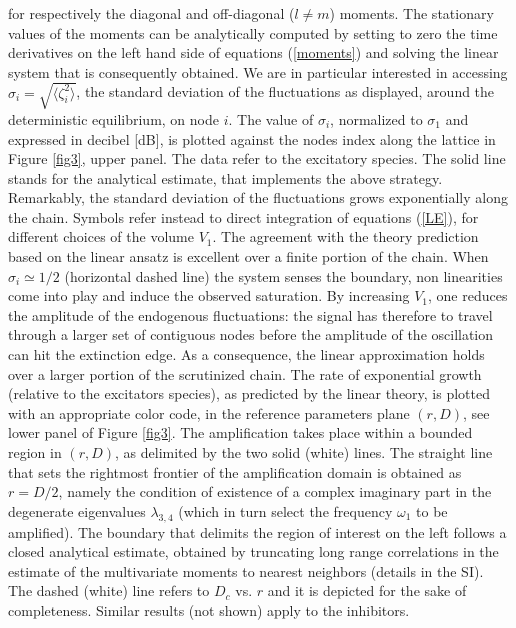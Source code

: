 \documentclass[showpacs,prl,superscriptaddress,nofootinbib, twocolumn]{revtex4}
\begin{document}
for respectively the diagonal and off-diagonal ($l \ne m$) moments. The stationary values of the moments can be analytically computed by setting to zero the time derivatives on the left hand side of equations (\ref{moments}) and solving the linear system that is consequently obtained. We are in particular interested in accessing $\sigma_i=\sqrt{\langle \zeta_i^2 \rangle}$, the standard deviation of the fluctuations as displayed, around the deterministic equilibrium, on node $i$. The value of  $\sigma_i$, normalized to $\sigma_1$ and expressed in decibel [dB], is plotted against the nodes index along the lattice in Figure  \ref{fig3}, upper panel. The data refer to the excitatory species. The solid line stands for the analytical estimate, that implements the above strategy. Remarkably, the standard deviation of the fluctuations grows exponentially along the chain. Symbols refer instead to direct integration of equations (\ref{LE}), for different choices of the volume $V_1$. The agreement with the theory prediction based on the linear ansatz is excellent over a finite portion of the chain. When $\sigma_i \simeq 1/2$ (horizontal dashed line) the system senses the boundary, non linearities come into play and induce the observed saturation. By increasing $V_1$, one reduces the amplitude of the endogenous fluctuations: the signal has therefore to travel through a larger set of contiguous nodes before the amplitude of the oscillation  can hit the extinction edge. As a consequence, the linear approximation holds over a larger portion of the scrutinized chain.
The rate of exponential growth (relative to the excitators species), as predicted by the linear theory, is plotted with an appropriate color code, in the reference parameters plane $(r,D)$, see lower panel of Figure \ref{fig3}. The amplification takes place within a bounded region in $(r,D)$, as delimited by the two solid (white) lines. The straight line that sets the rightmost frontier of the amplification domain is  obtained as $r=D/2$, namely the condition of existence of a complex imaginary part in the degenerate eigenvalues $\lambda_{3,4}$ (which in turn select the frequency $\omega_1$ to be amplified). The boundary that delimits the region of interest on the left follows a closed analytical estimate, obtained by truncating long range correlations in the estimate of the multivariate moments to nearest neighbors (details in the SI). The dashed (white) line refers to $D_c$ vs. $r$ and it is depicted for the sake of completeness. Similar results (not shown) apply to the inhibitors. 
\end{document}
